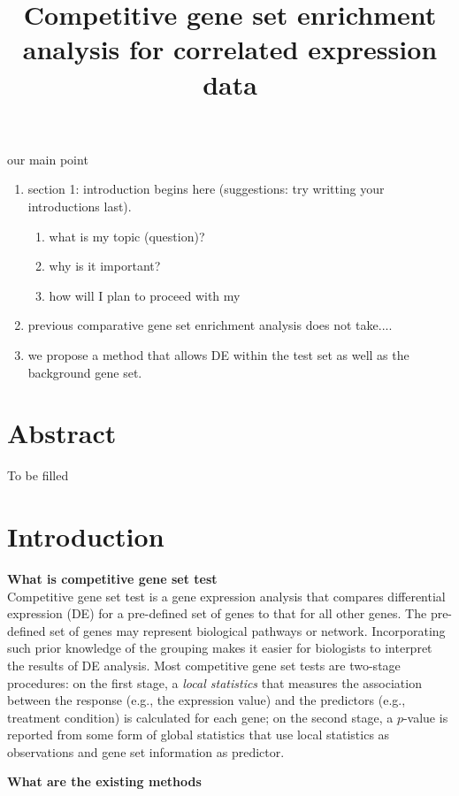 \documentclass[11pt, a4paper]{article}
\title{Competitive gene set enrichment analysis for correlated expression data}
\date{} %
\begin{document}
	our main point
	\begin{enumerate}
		\item section 1:  introduction begins here (suggestions: try writting your introductions last).
		 \begin{enumerate}
		 	\item what is my topic (question)?
		 	\item why is it important?
		 	\item how will I plan to proceed with my
		 \end{enumerate}
		\item previous comparative gene set enrichment analysis does not take....
		\item we propose a method that allows DE within the test set as well as the background gene set.
	\end{enumerate}
	
	
	\newpage
	\maketitle
	
	\section*{Abstract}
	To be filled
	
	\section{Introduction}\label{section:introduction}
	\textbf{What is competitive gene set test}\\
	 Competitive gene set test \citep{goeman2007analyzing} is a gene expression analysis that compares differential expression (DE) for a pre-defined set of genes to that for all other genes. The pre-defined set of genes may represent biological pathways or network. Incorporating such prior knowledge of the grouping makes it easier for biologists to interpret the results of DE analysis. Most competitive gene set tests are two-stage procedures: on the first stage, a \textit{local statistics} that measures the association between the response (e.g., the expression value) and the predictors (e.g., treatment condition) is calculated for each gene; on the second stage, a $p$-value is reported from some form of global statistics that use local statistics as observations and gene set information as predictor. 
	
	\textbf{What are the existing methods}\\
	
\end{document}
